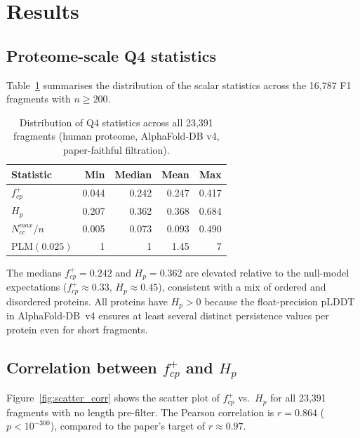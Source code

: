 \section{Results}
\label{sec:results}

\subsection{Proteome-scale Q4 statistics}
\label{sec:results_q4}

Table~\ref{tab:proteome_summary} summarises the distribution of the
scalar statistics across the 16{,}787 F1 fragments with $n \geq 200$.

\begin{table}[t]
\caption{Distribution of Q4 statistics across all 23{,}391 fragments
(human proteome, AlphaFold-DB v4, paper-faithful filtration).}
\label{tab:proteome_summary}
\centering
\small
\begin{tabular}{lrrrr}
\toprule
Statistic & Min & Median & Mean & Max \\
\midrule
$f^+_{cp}$            & 0.044 & 0.242 & 0.247 & 0.417 \\
$H_p$                 & 0.207 & 0.362 & 0.368 & 0.684 \\
$N_{cc}^{max}/n$      & 0.005 & 0.073 & 0.093 & 0.490 \\
$\mathrm{PLM}(0.025)$ & 1     & 1     & 1.45  & 7     \\
\bottomrule
\end{tabular}
\end{table}

The medians $f^+_{cp} = 0.242$ and $H_p = 0.362$ are elevated relative
to the null-model expectations ($f^+_{cp} \approx 0.33$, $H_p \approx 0.45$),
consistent with a mix of ordered and disordered proteins.
All proteins have $H_p > 0$ because the float-precision pLDDT in
AlphaFold-DB~v4 ensures at least several distinct persistence values
per protein even for short fragments.

\subsection{Correlation between $f^+_{cp}$ and $H_p$}
\label{sec:results_corr}

Figure~\ref{fig:scatter_corr} shows the scatter plot of $f^+_{cp}$
vs.\ $H_p$ for all 23{,}391 fragments with no length pre-filter.
The Pearson correlation is $r = 0.864$ ($p < 10^{-300}$), compared to
the paper's target of $r \approx 0.97$.

